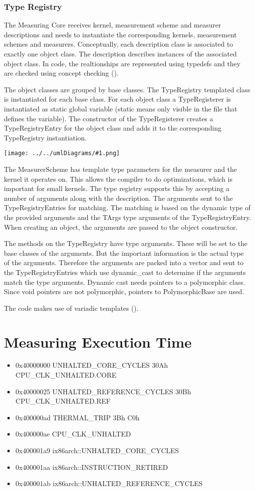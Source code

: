 \documentclass[a4paper,12pt]{article}
\newcommand{\umlDiagram}[1]{\begin{center}\texttt{[image: ../../umlDiagrams/\#1.png]}\end{center}}
\begin{document}
\subsubsection{Type Registry}
The Measuring Core receives kernel, measurement scheme and measurer descriptions and needs to instantiate the corresponding kernels, measurement schemes and measurers. Conceptually, each description class is associated to exactly one object class. The description describes instances of the associated object class. In code, the realtionships are represented using typedefs and they are checked using concept checking (\cite{siek01_concept_check}).

The object classes are grouped by base classes. The TypeRegistry templated class is instantiated for each base class. For each object class a TypeRegisterer is instantiated as static global variable (static means only visible in the file that defines the variable). The constructor of the TypeRegisterer creates a TypeRegistryEntry for the object class and adds it to the corresponding TypeRegistry instantiation.

\umlDiagram{TypeRegistry}

The MeasurerScheme has template type parameters for the measurer and the kernel it operates on. This allows the compiler to do optimizations, which is important for small kernels. The type registry supports this by accepting a number of arguments along with the description. The arguments sent to the TypeRegistryEntries for matching. The matching is based on the dynamic type of the provided arguments and the TArgs type arguments of the TypeRegistryEntry. When creating an object, the arguments are passed to the object constructor.

The methods on the TypeRegistry have type arguments. These will be set to the base classes of the arguments. But the important information is the actual type of the arguments. Therefore the arguments are packed into a vector and sent to the TypeRegistryEntries which use dynamic\_cast to determine if the arguments match the type arguments. Dynamic cast needs pointers to a polymorphic class. Since void pointers are not polymorphic, pointers to PolymorphicBase are used.

The code makes use of variadic templates (\cite{Gregor06:variadics_rev_3}).

\section{Measuring Execution Time}
\begin{itemize}
\item 0x40000000   UNHALTED\_CORE\_CYCLES 30Ah CPU\_CLK\_UNHALTED.CORE
\item 0x40000025   UNHALTED\_REFERENCE\_CYCLES 30Bh CPU\_CLK\_UNHALTED.REF
\item 0x400000ad   THERMAL\_TRIP 3Bh C0h 
\item 0x400000ae   CPU\_CLK\_UNHALTED
\item 0x400001a9   ix86arch::UNHALTED\_CORE\_CYCLES
\item 0x400001aa   ix86arch::INSTRUCTION\_RETIRED
\item 0x400001ab   ix86arch::UNHALTED\_REFERENCE\_CYCLES 
\end{itemize}
\end{document}

